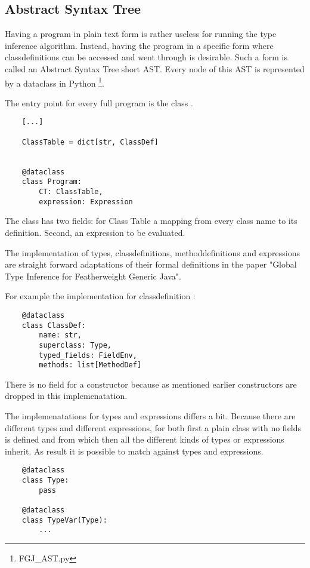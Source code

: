 \subsection{Abstract Syntax Tree}

Having a program in plain text form is rather useless for running the type inference algorithm. Instead, having the program in a specific form where classdefinitions can be accessed and went through is desirable.
Such a form is called an Abstract Syntax Tree short AST. Every node of this AST is represented by a dataclass in Python \footnote{FGJ\_AST.py}.

The entry point for every full program is the class .
\begin{verbatim}
    [...]

    ClassTable = dict[str, ClassDef]


    @dataclass
    class Program:
        CT: ClassTable,
        expression: Expression
\end{verbatim}

The class  has two fields:  for Class Table a mapping from every class name to its definition. Second,  an expression to be evaluated.

The implementation of types, classdefinitions, methoddefinitions and expressions are straight forward adaptations of their formal definitions in the paper "Global Type Inference for Featherweight Generic
Java".

For example the implementation for classdefinition :
\begin{verbatim}
    @dataclass
    class ClassDef:
        name: str,
        superclass: Type,
        typed_fields: FieldEnv,
        methods: list[MethodDef]
\end{verbatim}

There is no field for a constructor because as mentioned earlier constructors are dropped in this implemenatation.

The implemenatations for types and expressions differs a bit. Because there are different types and different expressions, for both first a plain class with no fields is defined  and  from which then all the different kinds of types or expressions inherit.
As result it is possible to match against types and expressions.

\begin{verbatim}
    @dataclass
    class Type:
        pass

    @dataclass
    class TypeVar(Type):
        ...
\end{verbatim}

